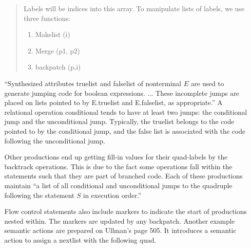 \documentclass[11pt]{article}
\begin{document}
\begin{quote}
Labels will be indices into this array.  To manipulate lists of labels, we use three functions:
\begin{enumerate}
\item Makelist (i)
\item Merge  (p1, p2) 
\item backpatch (p,i)
\end{enumerate}

\end{quote}


``Synthesized attributes truelist and falselist of nonterminal $E$ are used to generate jumping code for boolean expressions. ... These incomplete jumps are placed on lists pointed to by E.truelist and E.falselist, as appropriate.''  A relational operation conditional tends to have at least two jumps: the conditional jump and the unconditional jump.  Typically, the truelist belongs to the code pointed to by the  conditional jump, and the false list is associated with the code following the unconditional jump.    

Other productions end up getting fill-in values for their quad-labels by the backtrack operations.  This is due to the fact some operations fall within the statements such that they are part of branched code.    Each of these productions maintain ``a list of all conditional and unconditional jumps to the quadruple following the statement $S$ in execution order.''       

Flow control statements also include markers to indicate the start of productions nested within.    The markers are updated by any backpatch.  Another example semantic actions are prepared on Ullman's page 505.    It introduces a semantic action to assign a nextlist with the following quad.  
\end{document}
